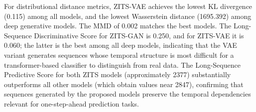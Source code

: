 \documentclass[make,article,submit,moreauthors]{Definitions/mdpi}
\begin{document}
For distributional distance metrics, ZITS-VAE achieves the lowest KL divergence (0.115) among all models, and the lowest Wasserstein distance (1695.392) among deep generative models. The MMD of 0.002 matches the best models. The Long-Sequence Discriminative Score for ZITS-GAN is 0.250, and for ZITS-VAE it is 0.060; the latter is the best among all deep models, indicating that the VAE variant generates sequences whose temporal structure is most difficult for a transformer-based classifier to distinguish from real data. The Long-Sequence Predictive Score for both ZITS models (approximately 2377) substantially outperforms all other models (which obtain values near 2847), confirming that sequences generated by the proposed models preserve the temporal dependencies relevant for one-step-ahead prediction tasks.


\end{document}
